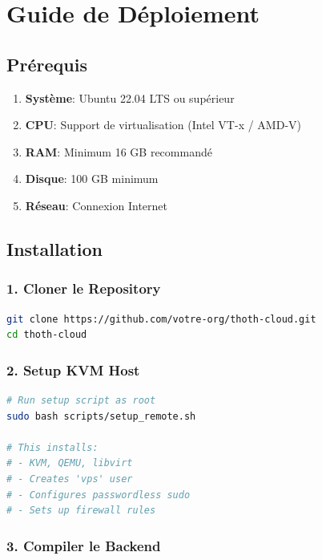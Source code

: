 \documentclass[12pt,a4paper]{article}
\begin{document}
\section{Guide de Déploiement}

\subsection{Prérequis}

\begin{enumerate}
    \item \textbf{Système}: Ubuntu 22.04 LTS ou supérieur
    \item \textbf{CPU}: Support de virtualisation (Intel VT-x / AMD-V)
    \item \textbf{RAM}: Minimum 16 GB recommandé
    \item \textbf{Disque}: 100 GB minimum
    \item \textbf{Réseau}: Connexion Internet
\end{enumerate}

\subsection{Installation}

\subsubsection{1. Cloner le Repository}

\begin{lstlisting}[language=bash, caption=Clonage du projet]
git clone https://github.com/votre-org/thoth-cloud.git
cd thoth-cloud
\end{lstlisting}

\subsubsection{2. Setup KVM Host}

\begin{lstlisting}[language=bash, caption=Configuration hôte KVM]
# Run setup script as root
sudo bash scripts/setup_remote.sh

# This installs:
# - KVM, QEMU, libvirt
# - Creates 'vps' user
# - Configures passwordless sudo
# - Sets up firewall rules
\end{lstlisting}

\subsubsection{3. Compiler le Backend}
\end{document}
